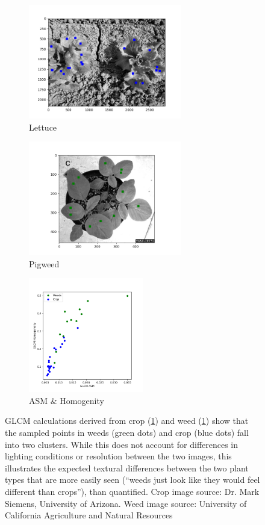 \documentclass[letterpaper]{article}
\begin{document}
{\begin{figure}[H]
	\begin{subfigure}[h]{0.28\linewidth}
		\includegraphics[height=5cm]{./figures/glcm-crop.png}
		\caption{Lettuce}
		\label{subfig:glcm_crop}	
	\end{subfigure}
	\hfill
	\begin{subfigure}[h]{0.28\linewidth}
		\includegraphics[height=5cm]{./figures/glcm-weed.png}
		\caption{Pigweed}
		\label{subfig:glcm_weed}		
	\end{subfigure}%
	\hfill
	\begin{subfigure}[h]{0.28\linewidth}
		\includegraphics[height=5cm]{./figures/glcm-plot.png}
		\caption{ASM \& Homogenity}
		\label{subfig:glcm_plot}		
	\end{subfigure}%
	\hfill
	\caption[An example of GLCM calculations for weed and crop]{GLCM calculations derived from crop (\ref{subfig:glcm_crop}) and weed (\ref{subfig:glcm_crop}) show that the sampled points in weeds (green dots) and crop (blue dots) fall into two clusters. While this does not account for differences in lighting conditions or resolution between the two images, this illustrates the expected textural differences between the two plant types that are more easily seen (``weeds just look like they would feel different than crops''), than quantified. Crop image source: Dr. Mark Siemens, University of Arizona. Weed image source: University of California Agriculture and Natural Resources}
	\label{fig:glcm}
\end{figure}

}
\end{document}
